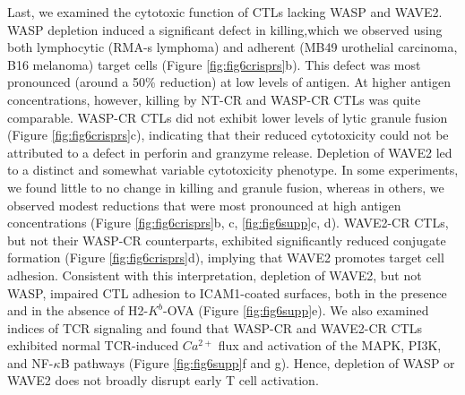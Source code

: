 Last, we examined the cytotoxic function of CTLs lacking WASP and WAVE2. WASP depletion induced a significant defect in killing,which we observed using both lymphocytic (RMA-s lymphoma) and adherent (MB49 urothelial carcinoma, B16 melanoma) target cells (Figure \ref{fig:fig6crisprs}b). This defect was most pronounced (around a 50\% reduction) at low levels of antigen. At higher antigen concentrations, however, killing by NT-CR and WASP-CR CTLs was quite comparable. WASP-CR CTLs did not exhibit lower levels of lytic granule fusion (Figure \ref{fig:fig6crisprs}c), indicating that their reduced cytotoxicity could not be attributed to a defect in perforin and granzyme release. Depletion of WAVE2 led to a distinct and somewhat variable cytotoxicity phenotype. In some experiments, we found little to no change in killing and granule fusion, whereas in others, we observed modest reductions that were most pronounced at high antigen concentrations (Figure \ref{fig:fig6crisprs}b, c, \ref{fig:fig6supp}c, d). WAVE2-CR CTLs, but not their WASP-CR counterparts, exhibited significantly reduced conjugate formation (Figure \ref{fig:fig6crisprs}d), implying that WAVE2 promotes target cell adhesion. Consistent with this interpretation, depletion of WAVE2, but not WASP, impaired CTL adhesion to ICAM1-coated surfaces, both in the presence and in the absence of H2-$K^{b}$-OVA (Figure \ref{fig:fig6supp}e). We also examined indices of TCR signaling and found that WASP-CR and WAVE2-CR CTLs exhibited normal TCR-induced $Ca^{2+}$ flux and activation of the MAPK, PI3K, and NF-$\kappa$B pathways (Figure \ref{fig:fig6supp}f and g). Hence, depletion of WASP or WAVE2 does not broadly disrupt early T cell activation. 

